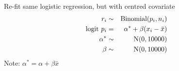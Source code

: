 \begin{frame}[fragile]
\begin{center}
\end{center}
\end{frame}


\begin{frame}[fragile]
\vspace{2mm}Re-fit same logistic regression, but with centred covariate
\begin{eqnarray*}
r_i & \sim & \hbox{Binomial}(p_i, n_i)\\
\hbox{logit } p_i & = & \alpha^* + \beta (x_i - \bar{x})\\
\alpha^* & \sim &{\rm N}(0, 10000)\\
\beta & \sim& {\rm N}(0, 10000)
\end{eqnarray*}
Note: $\alpha^* = \alpha + \beta \bar{x}$
\begin{center}
\end{center}
\end{frame}

